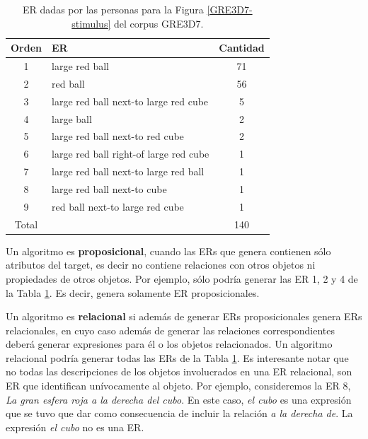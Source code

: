 \begin{table}[h!]
\begin{center}
\begin{tabular}{|c|l|c|}
\hline
 Orden&ER& Cantidad \\
\hline
1&large red ball & 71 \\
2&red ball & 56 \\ 
3&large red ball next-to large red cube & 5 \\ 
4&large ball & 2 \\ 
5&large red ball next-to red cube & 2 \\ 
6&large red ball right-of large red cube & 1 \\ 
7&large red ball next-to large red ball & 1 \\ 
8&large red ball next-to cube & 1 \\ 
9&red ball next-to large red cube & 1 \\ \hline
Total & &140 \\ \hline
\end{tabular}
\caption{ER dadas por las personas para la Figura \ref{GRE3D7-stimulus} del corpus GRE3D7.} 
\label{er-gre3d7-stimulus}
\vspace*{-.5cm}
\end{center}
\end{table}

Un algoritmo es {\bf proposicional}, cuando las ERs que genera contienen s\'olo atributos del target, es decir no contiene relaciones con otros objetos ni propiedades de otros objetos. Por ejemplo, s\'olo podr\'ia generar las ER 1, 2 y 4 de la Tabla \ref{er-gre3d7-stimulus}. Es decir, genera solamente ER proposicionales.

Un algoritmo es {\bf relacional} si adem\'as de generar ERs proposicionales genera ERs relacionales, en cuyo caso adem\'as de generar las relaciones correspondientes deber\'a generar expresiones para \'el o los objetos relacionados. Un algoritmo relacional podr\'ia generar todas las ERs de la Tabla \ref{er-gre3d7-stimulus}. Es interesante notar que no todas las descripciones de los objetos involucrados en una ER relacional, son ER que identifican un\'ivocamente al objeto. Por ejemplo, consideremos la ER 8, {\it La gran esfera roja a la derecha del cubo}. En este caso, {\it el cubo} es una expresi\'on que se tuvo que dar como consecuencia de incluir la relaci\'on {\it a la derecha de}. La expresi\'on {\it el cubo} no es una ER. 

